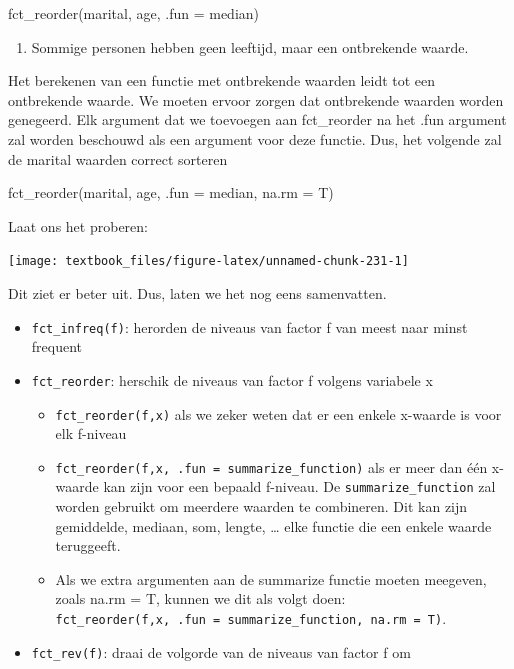 \documentclass[]{tufte-book}
\newenvironment{Shaded}{}{}
\newcommand{\DataTypeTok}[1]{\textcolor[rgb]{0.56,0.13,0.00}{#1}}
\newcommand{\KeywordTok}[1]{\textcolor[rgb]{0.00,0.44,0.13}{\textbf{#1}}}
\newcommand{\NormalTok}[1]{#1}
\newcommand{\OperatorTok}[1]{\textcolor[rgb]{0.40,0.40,0.40}{#1}}
\newcommand{\StringTok}[1]{\textcolor[rgb]{0.25,0.44,0.63}{#1}}
\providecommand{\tightlist}{%
  \setlength{\itemsep}{0pt}\setlength{\parskip}{0pt}}
\begin{document}
fct\_reorder(marital, age, .fun = median)

\begin{enumerate}
\def\labelenumi{\arabic{enumi}.}
\setcounter{enumi}{1}
\tightlist
\item
  Sommige personen hebben geen leeftijd, maar een ontbrekende waarde.
\end{enumerate}

Het berekenen van een functie met ontbrekende waarden leidt tot een ontbrekende waarde. We moeten ervoor zorgen dat ontbrekende waarden worden genegeerd. Elk argument dat we toevoegen aan fct\_reorder na het .fun argument zal worden beschouwd als een argument voor deze functie. Dus, het volgende zal de marital waarden correct sorteren

fct\_reorder(marital, age, .fun = median, na.rm = T)

Laat ons het proberen:

\begin{Shaded}
\end{Shaded}

\texttt{[image: textbook\_files/figure-latex/unnamed-chunk-231-1]}

Dit ziet er beter uit. Dus, laten we het nog eens samenvatten.

\begin{itemize}
\tightlist
\item
  \texttt{fct\_infreq(f)}: herorden de niveaus van factor f van meest naar minst frequent
\item
  \texttt{fct\_reorder}: herschik de niveaus van factor f volgens variabele x

  \begin{itemize}
  \tightlist
  \item
    \texttt{fct\_reorder(f,x)} als we zeker weten dat er een enkele x-waarde is voor elk f-niveau
  \item
    \texttt{fct\_reorder(f,x,\ .fun\ =\ summarize\_function)} als er meer dan één x-waarde kan zijn voor een bepaald f-niveau. De \texttt{summarize\_function} zal worden gebruikt om meerdere waarden te combineren. Dit kan zijn gemiddelde, mediaan, som, lengte, \ldots{} elke functie die een enkele waarde teruggeeft.
  \item
    Als we extra argumenten aan de summarize functie moeten meegeven, zoals na.rm = T, kunnen we dit als volgt doen: \texttt{fct\_reorder(f,x,\ .fun\ =\ summarize\_function,\ na.rm\ =\ T)}.
  \end{itemize}
\item
  \texttt{fct\_rev(f)}: draai de volgorde van de niveaus van factor f om
\end{itemize}
\end{document}
